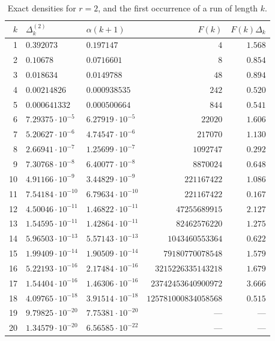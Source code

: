 \documentclass[11pt,reqno]{amsart}
\theoremstyle{plain}
\theoremstyle{definition}
\numberwithin{equation}{section}
\begin{document}
\begin{table}[ht]
\caption{Exact densities for $r=2$, and the first occurrence of a run of length $k$.}
\label{tab:delta}
\begin{tabular}{rllrr}
\toprule
$k$ & $\Delta^{(2)}_k$ & $\alpha(k+1)$ & $F(k)$ & $F(k)\Delta_k$\\
\midrule
1 & $0.392073$ & $0.197147$ & $4$ & $1.568$ \\
2 & $0.10678$ & $0.0716601$ & $8$ & $0.854$ \\
3 & $0.018634$ & $0.0149788$ & $48$ & $0.894$ \\
4 & $0.00214826$ & $0.000938535$ & $242$ & $0.520$ \\
5 & $0.000641332$ & $0.000500664$ & $844$ & $0.541$ \\
6 & $7.29375\cdot10^{-5}$ & $6.27919\cdot10^{-5}$ & $22020$ & $1.606$ \\
7 & $5.20627\cdot10^{-6}$ & $4.74547\cdot10^{-6}$ & $217070$ & $1.130$ \\
8 & $2.66941\cdot10^{-7}$ & $1.25699\cdot10^{-7}$ & $1092747$ & $0.292$ \\
9 & $7.30768\cdot10^{-8}$ & $6.40077\cdot10^{-8}$ & $8870024$ & $0.648$ \\
10 & $4.91166\cdot10^{-9}$ & $3.44829\cdot10^{-9}$ & $221167422$ & $1.086$ \\
11 & $7.54184\cdot10^{-10}$ & $6.79634\cdot10^{-10}$ & $221167422$ & $0.167$ \\
12 & $4.50046\cdot10^{-11}$ & $1.46822\cdot10^{-11}$ & $47255689915$ & $2.127$ \\
13 & $1.54595\cdot10^{-11}$ & $1.42864\cdot10^{-11}$ & $82462576220$ & $1.275$ \\
14 & $5.96503\cdot10^{-13}$ & $5.57143\cdot10^{-13}$ & $1043460553364$ & $0.622$ \\
15 & $1.99409\cdot10^{-14}$ & $1.90509\cdot10^{-14}$ & $79180770078548$ & $1.579$ \\
16 & $5.22193\cdot10^{-16}$ & $2.17484\cdot10^{-16}$ & $3215226335143218$ & $1.679$ \\
17 & $1.54404\cdot10^{-16}$ & $1.46306\cdot10^{-16}$ & $23742453640900972$ & $3.666$ \\
18 & $4.09765\cdot10^{-18}$ & $3.91514\cdot10^{-18}$ & $125781000834058568$ & $0.515$ \\
19 & $9.79825\cdot10^{-20}$ & $7.75381\cdot10^{-20}$ & --- & --- \\
20 & $1.34579\cdot10^{-20}$ & $6.56585\cdot10^{-22}$ & --- & --- \\
\bottomrule
\end{tabular}
\end{table}
\end{document}
